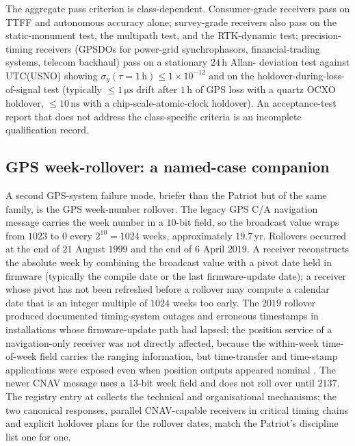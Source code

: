 The aggregate pass criterion is class-dependent. Consumer-grade
receivers pass on TTFF and autonomous accuracy alone; survey-grade
receivers also pass on the static-monument test, the multipath
test, and the RTK-dynamic test; precision-timing receivers
(GPSDOs for power-grid synchrophasors, financial-trading systems,
telecom backhaul) pass on a stationary $24 \,\si{\hour}$ Allan-
deviation test against UTC(USNO) showing
$\sigma_{y}(\tau = 1 \,\si{\hour}) \leq 1 \times 10^{-12}$ and on
the holdover-during-loss-of-signal test (typically
$\leq 1 \,\si{\micro\second}$ drift after $1 \,\si{\hour}$ of GPS
loss with a quartz OCXO holdover, $\leq 10 \,\si{\nano\second}$
with a chip-scale-atomic-clock holdover). An acceptance-test
report that does not address the class-specific criteria is an
incomplete qualification record.

\subsection{GPS week-rollover: a named-case companion}

A second GPS-system failure mode, briefer than the Patriot but
of the same family, is the GPS week-number rollover. The legacy
GPS C/A navigation message carries the week number in a $10$-bit
field, so the broadcast value wraps from $1023$ to $0$ every
$2^{10} = 1024$ weeks, approximately $19.7\,\text{yr}$.
Rollovers occurred at the end of $21$ August $1999$ and the end
of $6$ April $2019$. A receiver reconstructs the absolute week by
combining the broadcast value with a pivot date held in firmware
(typically the compile date or the last firmware-update date); a
receiver whose pivot has not been refreshed before a rollover
may compute a calendar date that is an integer multiple of $1024$
weeks too early. The $2019$ rollover produced documented
timing-system outages and erroneous timestamps in installations
whose firmware-update path had lapsed; the position service of a
navigation-only receiver was not directly affected, because the
within-week time-of-week field carries the ranging information,
but time-transfer and time-stamp applications were exposed even
when position outputs appeared nominal
\cite{web:gpsgov-week-rollover-2019,
web:dhs-cisa-gps-rollover-2019,web:nist-gps-week-rollover-2019}.
The newer CNAV message uses a $13$-bit week field and does not
roll over until $2137$. The registry entry at
collects the technical and organisational mechanisms; the two
canonical responses, parallel CNAV-capable receivers in critical
timing chains and explicit holdover plans for the rollover dates,
match the Patriot's discipline list one for one.

